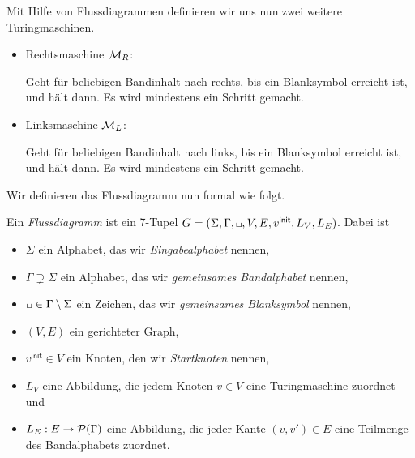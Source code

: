 \begin{Bsp}
 Mit Hilfe von Flussdiagrammen definieren wir uns nun zwei weitere Turingmaschinen.
  \begin{itemize}
  \item Rechtsmaschine $\mathcal{M}_R$:
  
  Geht für beliebigen Bandinhalt nach rechts, bis ein Blanksymbol erreicht ist, und hält dann.
  Es wird mindestens ein Schritt gemacht.
  

  
  \item Linksmaschine $\mathcal{M}_L$:
  
  Geht für beliebigen Bandinhalt nach links, bis ein Blanksymbol erreicht ist, und hält dann.
  Es wird mindestens ein Schritt gemacht.

  \qedhere
 \end{itemize}
\end{Bsp}

Wir definieren das Flussdiagramm nun formal wie folgt.


\begin{Def}%
Ein \emph{Flussdiagramm} ist ein 7-Tupel $G=(\Sigma, \Gamma, \blank,V,E,v^\mathsf{init},L_V,L_E)$.
Dabei ist
\begin{itemize}
 \item $\Sigma$ ein Alphabet, das wir \emph{Eingabealphabet} nennen,
 \item $\Gamma\supsetneq \Sigma$ ein Alphabet, das wir \emph{gemeinsames Bandalphabet} nennen,
 \item $\blank\in \Gamma\setminus\Sigma$ ein Zeichen, das wir \emph{gemeinsames Blanksymbol} nennen,
 \item $(V,E)$ ein gerichteter Graph,
 \item $v^\mathsf{init}\in V$ ein Knoten, den wir \emph{Startknoten} nennen,
 \item $L_V$ eine Abbildung, die jedem Knoten $v \in V$ eine Turingmaschine zuordnet und
 \item $L_E: E \to \mathcal{P}(\Gamma)$ eine Abbildung, die jeder Kante $(v,v')\in E$ eine Teilmenge des Bandalphabets zuordnet.
 \qedhere
\end{itemize}
\end{Def}


